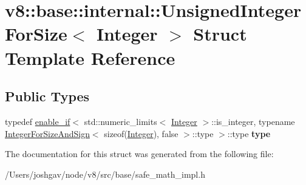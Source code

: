 \hypertarget{structv8_1_1base_1_1internal_1_1_unsigned_integer_for_size}{}\section{v8\+:\+:base\+:\+:internal\+:\+:Unsigned\+Integer\+For\+Size$<$ Integer $>$ Struct Template Reference}
\label{structv8_1_1base_1_1internal_1_1_unsigned_integer_for_size}
\subsection*{Public Types}
\begin{DoxyCompactItemize}
\item 
typedef \hyperlink{structv8_1_1base_1_1internal_1_1enable__if}{enable\+\_\+if}$<$ std\+::numeric\+\_\+limits$<$ \hyperlink{classv8_1_1_integer}{Integer} $>$\+::is\+\_\+integer, typename \hyperlink{structv8_1_1base_1_1internal_1_1_integer_for_size_and_sign}{Integer\+For\+Size\+And\+Sign}$<$ sizeof(\hyperlink{classv8_1_1_integer}{Integer}), false $>$\+::type $>$\+::type {\bfseries type}\hypertarget{structv8_1_1base_1_1internal_1_1_unsigned_integer_for_size_ac22b922d03077bff454fa4cb1529cb93}{}\label{structv8_1_1base_1_1internal_1_1_unsigned_integer_for_size_ac22b922d03077bff454fa4cb1529cb93}

\end{DoxyCompactItemize}


The documentation for this struct was generated from the following file\+:\begin{DoxyCompactItemize}
\item 
/\+Users/joshgav/node/v8/src/base/safe\+\_\+math\+\_\+impl.\+h\end{DoxyCompactItemize}
